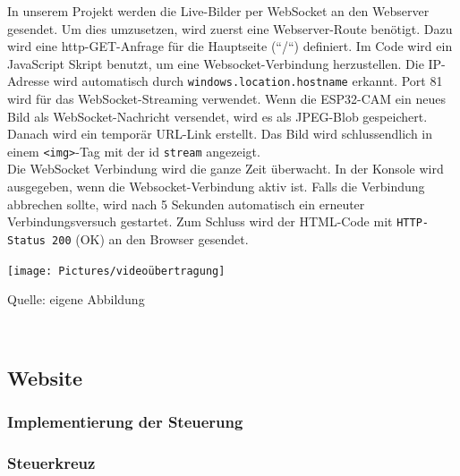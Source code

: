 \documentclass[ngerman,12pt,a4paper]{article}
\begin{document}
	In unserem Projekt werden die Live-Bilder per WebSocket an den Webserver gesendet. Um dies umzusetzen, wird zuerst eine Webserver-Route benötigt. Dazu wird eine http-GET-Anfrage für die Hauptseite (“/“) definiert. Im Code wird ein JavaScript Skript benutzt, um eine Websocket-Verbindung herzustellen. Die IP-Adresse wird automatisch durch \texttt{windows.location.hostname} erkannt. Port 81 wird für das WebSocket-Streaming verwendet. Wenn die ESP32-CAM ein neues Bild als WebSocket-Nachricht versendet, wird es als JPEG-Blob gespeichert. Danach wird ein temporär URL-Link erstellt. Das Bild wird schlussendlich in einem \texttt{<img>}-Tag mit der id \texttt{stream} angezeigt. \\[0.5cm]
	Die WebSocket Verbindung wird die ganze Zeit überwacht. In der Konsole wird ausgegeben, wenn die Websocket-Verbindung aktiv ist. Falls die Verbindung abbrechen sollte, wird nach 5 Sekunden automatisch ein erneuter Verbindungsversuch gestartet. Zum Schluss wird der HTML-Code mit \texttt{HTTP-Status 200} (OK) an den Browser gesendet. 
	\begin{center}
		\begin{minipage}[t]{0.75\textwidth}
			\texttt{[image: Pictures/videoübertragung]}
			\label{fig:Videoübertragung}
			\vspace{-10pt}
			\begin{center}
				\par\small Quelle: eigene Abbildung 
			\end{center}
		\end{minipage} \\[0.75cm]
	\end{center}
	
		\subsection{Website}

			\subsubsection{Implementierung der Steuerung}
			
				\subsubsection*{Steuerkreuz}
				
\end{document}
